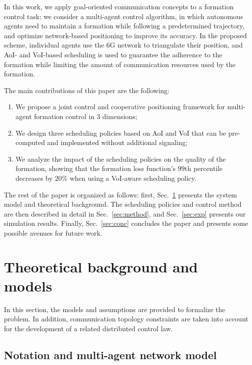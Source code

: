 \documentclass{ifac/ifacconf}
\begin{document}
In this work, we apply goal-oriented communication concepts to a formation control task: we consider a multi-agent control algorithm, in which autonomous agents need to maintain a formation while following a predetermined trajectory, and optimize network-based positioning to improve its accuracy. In the proposed scheme, individual agents use the 6G network to triangulate their position, and AoI- and VoI-based scheduling is used to guarantee the adherence to the formation while limiting the amount of communication resources used by the formation. 

The main contributions of this paper are the following:
\begin{enumerate}
    \item We propose a joint control and cooperative positioning framework for multi-agent formation control in $3$ dimensions;
    \item We design three scheduling policies based on AoI and VoI that can be pre-computed and implemented without additional signaling;
    \item We analyze the impact of the scheduling policies on the quality of the formation, showing that the formation loss function's $99$th percentile decreases by $20\%$ when using a VoI-aware scheduling policy.
\end{enumerate}

The rest of the paper is organized as follows: first, Sec.~\ref{sec:prelim} presents the system model and theoretical background. The scheduling policies and control method are then described in detail in Sec.~\ref{sec:method}, and Sec.~\ref{sec:exp} presents our simulation results. Finally, Sec.~\ref{sec:conc} concludes the paper and presents some possible avenues for future work.


\section{Theoretical background and models}\label{sec:prelim}

In this section, the models and assumptions are provided to formalize the problem. In addition, communication topology constraints are taken into account for the development of a related distributed control law.



\subsection{Notation and multi-agent network model}
\end{document}
